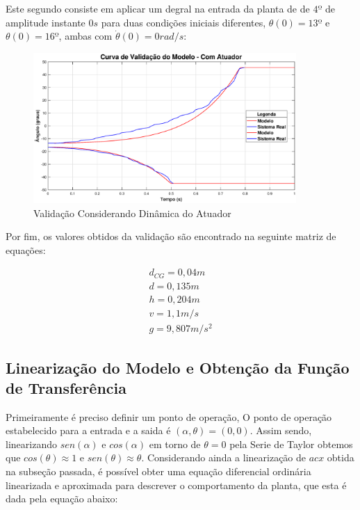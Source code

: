 \documentclass[conference,harvard,brazil,english]{sbatex}
\begin{document}
            Este segundo consiste em aplicar um degral na entrada da planta de de $4º$ de amplitude instante $0s$ para duas condições iniciais diferentes, $\theta(0) = 13º$ e $\theta(0) = 16º$, ambas com $\dot\theta(0)=0rad/s$:
            
            \begin{figure}[H]
                \hspace{-15mm}
                \includegraphics[width=10cm]{imagens/graficos/ValidacaoComAtuador.eps}
                \caption{Validação Considerando Dinâmica do Atuador}
            \end{figure}
            
            Por fim, os valores obtidos da validação são encontrado na seguinte matriz de equações:
            
            \begin{eqnarray}
                d_{CG} = 0,04m \nonumber\\
                d = 0,135m \nonumber\\
                h = 0,204m \nonumber\\
                v = 1,1  m/s \nonumber\\
                g = 9,807m/s^2
            \end{eqnarray}
        
        \subsection{Linearização do Modelo e Obtenção da Função de Transferência}
        
            Primeiramente é preciso definir um ponto de operação, O ponto de operação estabelecido para a entrada e a saida é $(\alpha,\theta)=(0,0)$. Assim sendo, linearizando $sen(\alpha)$ e $cos(\alpha)$ em torno de $\theta=0$ pela Serie de Taylor obtemos que $cos(\theta) \approx 1$ e $sen(\theta) \approx \theta$. Considerando ainda a linearização de $a{cx}$ obtida na subseção passada, é possível obter uma equação diferencial ordinária linearizada e aproximada para descrever o comportamento da planta, que esta é dada pela equação abaixo:
                
\end{document}
